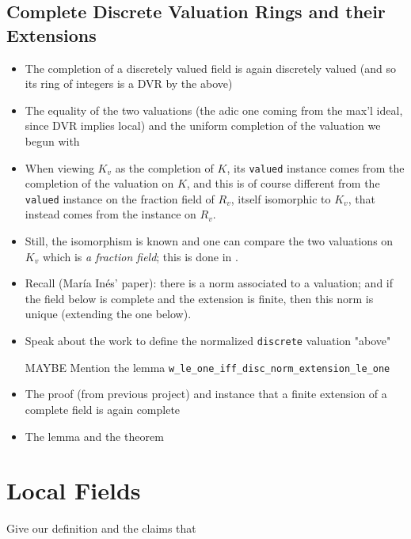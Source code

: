 \documentclass[sigplan,10pt,anonymous,review]{acmart}\settopmatter{printfolios=true,printccs=false,printacmref=false}
\begin{document}
\subsection{Complete Discrete Valuation Rings and their Extensions}
\begin{itemize}
\item The completion of a discretely valued field is again discretely valued (and so its ring of integers is a DVR by the above)
\item The equality of the two valuations (the adic one coming from the max'l ideal, since DVR implies local) and the uniform completion of the valuation we begun with
\item When viewing $K_v$ as the completion of $K$, its \texttt{valued} instance comes from the completion of the valuation on $K$, and this is of course different from the \texttt{valued} instance on the fraction field of $R_v$, itself isomorphic to $K_v$, that instead comes from the  instance on $R_v$.
\item Still, the isomorphism is known and one can compare the two valuations on $K_v$ which is \emph{a fraction field}; this is done in .
\item Recall (María Inés' paper): there is a norm associated to a valuation; and if the field below is complete and the extension is finite, then this norm is unique (extending the one below).
\item Speak about the work to define the normalized \texttt{discrete} valuation "above"
\item [MAYBE] Mention the lemma \texttt{w\_le\_one\_iff\_disc\_norm\_extension\_le\_one}
\item The proof (from previous project) and instance that a finite extension of a complete field is again complete
\item The lemma  and the theorem 
\end{itemize}
\section{Local Fields}
Give our definition and the claims that 
\end{document}
